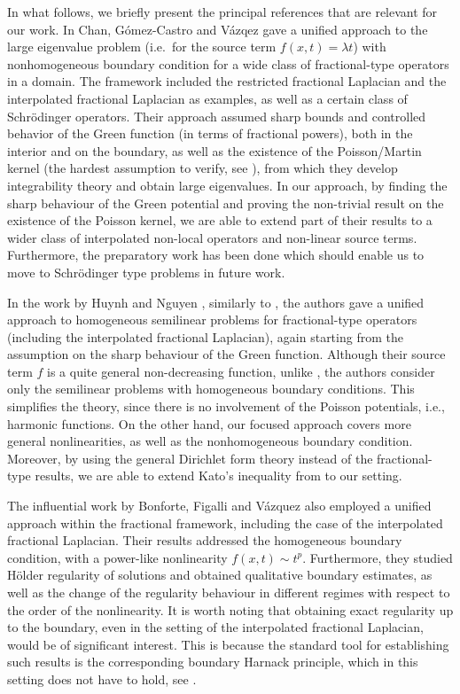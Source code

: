 \documentclass[12pt,a4paper,onecolumn]{article}
\theoremstyle{definition}
\newcommand{\1}{\mathbf 1}
\numberwithin{equation}{section}
\begin{document}
    
    In what follows, we briefly present the principal references that are relevant for our work. In \cite{CGcV-jfa21} Chan, G\'omez-Castro and V\'azqez  gave a unified approach to the large eigenvalue problem (i.e.~for the source term $f(x,t)=\lambda t$) with nonhomogeneous boundary condition for a wide class of fractional-type operators in a domain. The framework included the restricted fractional Laplacian and the interpolated fractional Laplacian as examples, as well as a certain class of Schr\"odinger operators. Their approach assumed sharp bounds and controlled behavior of the Green function (in terms of fractional powers), both in the interior and on the boundary, as well as the existence of the Poisson/Martin kernel (the hardest assumption to verify, see \cite[Remark 2.5]{CGcV-jfa21}), from which they develop integrability theory and obtain large eigenvalues. In our approach, by finding the sharp behaviour of the Green potential  and proving the non-trivial result on the existence of the Poisson kernel, we are able to extend part of their results to  a wider class of interpolated non-local operators and non-linear source terms. Furthermore, the preparatory work has been done which should enable us to move to Schr\"odinger type problems in future work.  

    In the work by Huynh and Nguyen \cite{HuynhNguyen2022_new}, similarly to \cite{CGcV-jfa21}, the authors gave a unified approach to homogeneous semilinear problems for fractional-type operators (including the interpolated fractional Laplacian), again starting from the assumption on the sharp behaviour of the Green function. Although their source term $f$ is a quite general non-decreasing function, unlike \cite{CGcV-jfa21}, the authors consider only the semilinear problems with homogeneous boundary conditions. This simplifies the theory, since there is no involvement of the Poisson potentials, i.e., harmonic functions. On the other hand, our focused approach covers more general nonlinearities, as well as the nonhomogeneous boundary condition. Moreover, by using the general Dirichlet form theory instead of the fractional-type results, we are able to extend Kato's inequality from \cite{HuynhNguyen2022_new} to our setting. 
    
    The influential work by Bonforte, Figalli and V\'azquez \cite{BFV-cvPDE18} also employed a unified approach within the fractional framework, including the case of the interpolated fractional Laplacian. Their results addressed the homogeneous boundary condition, with a power-like nonlinearity $f(x,t)\sim t^p$. Furthermore, they studied H\"older regularity of solutions and obtained qualitative boundary estimates, as well as the change of the regularity behaviour in different regimes with respect to the order of the nonlinearity. It is worth noting that obtaining exact regularity up to the boundary, even in the setting of the interpolated fractional Laplacian, would be of significant interest. This is because the standard tool for establishing such results is the corresponding boundary Harnack principle, which in this setting does not have to hold, see \cite{ksv2020boundary}.
    
\end{document}
